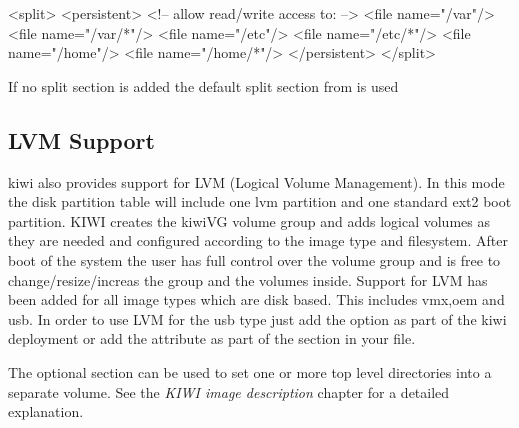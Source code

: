 \begin{xml}
<split>
   <persistent>
      <!-- allow read/write access to: -->
      <file name="/var"/>
      <file name="/var/*"/>
      <file name="/etc"/>
      <file name="/etc/*"/>
      <file name="/home"/>
      <file name="/home/*"/>
   </persistent>
</split>
\end{xml}

If no split section is added the default split section from
 is used

\subsection{LVM Support}

kiwi also provides support for LVM (Logical Volume Management). In this
mode the disk partition table will include one lvm partition and one
standard ext2 boot partition. KIWI creates the kiwiVG volume group and
adds logical volumes as they are needed and configured according to the
image type and filesystem. After boot of the system the user has full
control over the volume group and is free to change/resize/increas the
group and the volumes inside. Support for LVM has been added for all
image types which are disk based. This includes vmx,oem and usb.
In order to use LVM for the usb type just add the  option
as part of the kiwi  deployment or add the
attribute  as part of the  section
in your  file.

The optional  section can be used to set one or
more top level directories into a separate volume. See the
\textit{KIWI image description} chapter for a detailed explanation.
